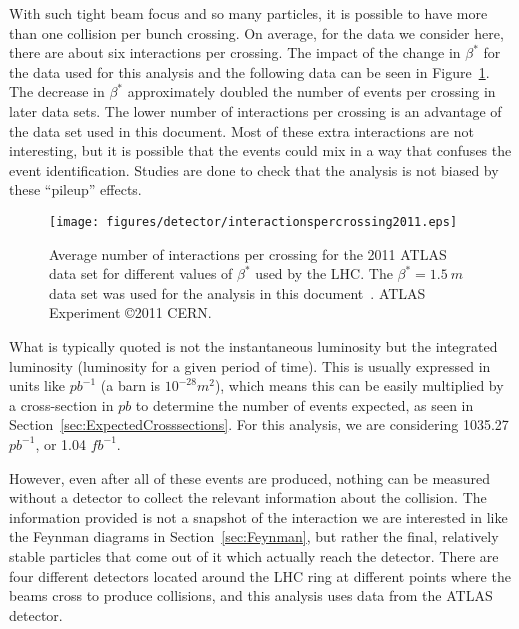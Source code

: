 With such tight beam focus and so many particles, it is possible to have more than one collision per bunch crossing.  On average, for the data we consider here, there are about six interactions per crossing.  The impact of the change in $\beta^{*}$ for the data used for this analysis and the following data can be seen in Figure~\ref{fig:betastar}.  The decrease in $\beta^{*}$ approximately doubled the number of events per crossing in later data sets.  The lower number of interactions per crossing is an advantage of the data set used in this document.  Most of these extra interactions are not interesting, but it is possible that the events could mix in a way that confuses the event identification.  Studies are done to check that the analysis is not biased by these ``pileup'' effects.

\begin{figure}[!htpb]
  \centering
    \texttt{[image: figures/detector/interactionspercrossing2011.eps]}
    \label{fig:betastar} 
\caption{Average number of interactions per crossing for the 2011 ATLAS data set for different values of $\beta^{*}$ used by the LHC.  The $\beta^{*} = 1.5~m$ data set was used for the analysis in this document~\cite{betastar}. ATLAS Experiment \copyright 2011 CERN.}
\end{figure}

What is typically quoted is not the instantaneous luminosity but the integrated luminosity (luminosity for a given period of time).  This is usually expressed in units like $pb^{-1}$ (a barn is $10^{-28} m^{2}$), which means this can be easily multiplied by a cross-section in $pb$ to determine the number of events expected, as seen in Section~\ref{sec:ExpectedCrosssections}.  For this analysis, we are considering 1035.27 $pb^{-1}$, or 1.04 $fb^{-1}$.

However, even after all of these events are produced, nothing can be measured without a detector to collect the relevant information about the collision.  The information provided is not a snapshot of the interaction we are interested in like the Feynman diagrams in Section~\ref{sec:Feynman}, but rather the final, relatively stable particles that come out of it which actually reach the detector.  There are four different detectors located around the LHC ring at different points where the beams cross to produce collisions, and this analysis uses data from the ATLAS detector.

